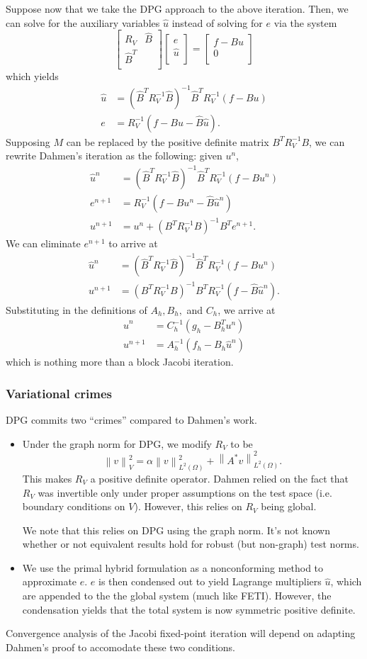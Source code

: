 \documentclass{article}
\newcommand{\nor}[1]{\left\| #1 \right\|}
\newcommand{\LRp}[1]{\left( #1 \right)}
\newcommand{\uh}{\widehat{u}}
\newcommand{\Bh}{\widehat{B}}
\renewcommand{\L}{L^2\LRp{\Omega}}
\def\arr#1#2#3#4{\left[
\begin{array}{cc}
#1 & #2\\
#3 & #4\\
\end{array}
\right]}
\def\vecttwo#1#2{\left[
\begin{array}{c}
#1\\
#2\\
\end{array}
\right]}
\begin{document}
Suppose now that we take the DPG approach to the above iteration.  Then, we can solve for the auxiliary variables $\widehat{u}$ instead of solving for $e$ via the system
\[
\arr{R_V}{\Bh}{\Bh^T}{}\vecttwo{e}{\uh} = \vecttwo{f-Bu}{0}
\]
which yields 
\begin{align*}
\uh &= (\Bh^TR_V^{-1}\Bh)^{-1} \Bh^T R_V^{-1}(f-Bu)\\
e &= R_V^{-1}(f - Bu - \Bh \uh ).
\end{align*}
Supposing $M$ can be replaced by the positive definite matrix $B^TR_V^{-1}B$, we can rewrite Dahmen's iteration as the following: given $u^n$,
\begin{align*}
\uh^n &= (\Bh^TR_V^{-1}\Bh)^{-1} \Bh^T R_V^{-1}(f-Bu^n)\\
e^{n+1} &= R_V^{-1}(f - Bu^n - \Bh \uh ^n) \\
u^{n+1} &= u^n + (B^TR_V^{-1}B)^{-1}B^Te^{n+1}.
\end{align*}
We can eliminate $e^{n+1}$ to arrive at 
\begin{align*}
\uh^n &= (\Bh^TR_V^{-1}\Bh)^{-1} \Bh^T R_V^{-1}(f-Bu^n)\\
u^{n+1} &= (B^TR_V^{-1}B)^{-1}B^TR_V^{-1}(f - \Bh \uh ^n) .
\end{align*}
Substituting in the definitions of $A_h, B_h,$ and $C_h$, we arrive at
\begin{align*}
\uh^n &= C_h^{-1} (g_h - B_h^T u^n)\\
u^{n+1} &= A_h^{-1}(f_h - B_h \uh ^n) 
\end{align*}
which is nothing more than a block Jacobi iteration.  

\subsubsection{Variational crimes}

DPG commits two ``crimes'' compared to Dahmen's work.  
\begin{itemize}
\item Under the graph norm for DPG, we modify $R_V$ to be 
\[
\nor{v}_V^2 = \alpha \nor{v}_{\L}^2 + \nor{A^*v}_{\L}^2.
\]
This makes $R_V$ a positive definite operator.  Dahmen relied on the fact that $R_V$ was invertible only under proper assumptions on the test space (i.e. boundary conditions on $V$).  However, this relies on $R_V$ being global.  

We note that this relies on DPG using the graph norm.  It's not known whether or not equivalent results hold for robust (but non-graph) test norms.  

\item We use the primal hybrid formulation as a nonconforming method to approximate $e$.  $e$ is then condensed out to yield Lagrange multipliers $\uh$, which are appended to the the global system (much like FETI).  However, the condensation yields that the total system is now symmetric positive definite.  
\end{itemize}
Convergence analysis of the Jacobi fixed-point iteration will depend on adapting Dahmen's proof to accomodate these two conditions.  
\end{document}
